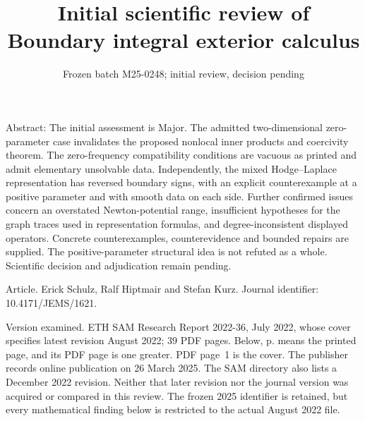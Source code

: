 \documentclass[10pt]{article}
\title{Initial scientific review of
Boundary integral exterior calculus}
\author{}
\date{Frozen batch M25-0248; initial review, decision pending}
\begin{document}
\maketitle
Abstract: The initial assessment is Major. The admitted two-dimensional zero-parameter case invalidates the proposed nonlocal inner products and coercivity theorem. The zero-frequency compatibility conditions are vacuous as printed and admit elementary unsolvable data. Independently, the mixed Hodge–Laplace representation has reversed boundary signs, with an explicit counterexample at a positive parameter and with smooth data on each side. Further confirmed issues concern an overstated Newton-potential range, insufficient hypotheses for the graph traces used in representation formulas, and degree-inconsistent displayed operators. Concrete counterexamples, counterevidence and bounded repairs are supplied. The positive-parameter structural idea is not refuted as a whole. Scientific decision and adjudication remain pending.\par
Article. Erick Schulz, Ralf Hiptmair and Stefan Kurz. Journal identifier: 10.4171/JEMS/1621.\par
Version examined. ETH SAM Research Report 2022-36, July 2022, whose cover specifies latest revision August 2022; 39 PDF pages. Below, p. means the printed page, and its PDF page is one greater. PDF page 1 is the cover. The publisher records online publication on 26 March 2025. The SAM directory also lists a December 2022 revision. Neither that later revision nor the journal version was acquired or compared in this review. The frozen 2025 identifier is retained, but every mathematical finding below is restricted to the actual August 2022 file.\par
\end{document}
